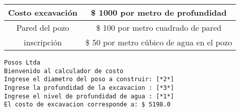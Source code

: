 \begin{enumerate}
    \begin{tabular}{c|c}
      \toprule
      Costo excavación & \$ 1000 por metro de profundidad \\
      \midrule
      Pared del pozo   & \$ 100 por metro cuadrado de pared \\
      \midrule
      inscripción      & \$ 50 por metro cúbico de agua en el pozo \\
    \bottomrule
    \end{tabular}

    \vspace*{\baselineskip}
    
    \begin{lstlisting}[style=consola]    
Posos Ltda
Bienvenido al calculador de costo
Ingrese el diametro del poso a construir: [*2*]
Ingrese la profundidad de la excavacion : [*3*]
Ingrese el nivel de profundidad de agua : [*1*]
El costo de excavacion corresponde a: $ 5198.0
    \end{lstlisting}
  \end{enumerate}
 